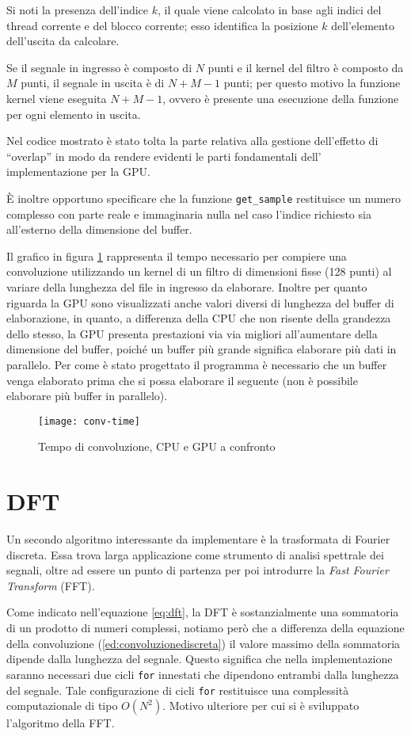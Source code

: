 Si noti la presenza dell'indice $k$, il quale viene calcolato in base agli indici del thread corrente e del blocco corrente; esso identifica la posizione $k$ dell'elemento dell'uscita da calcolare. 

Se il segnale in ingresso è composto di $N$ punti e il kernel del filtro è composto da $M$ punti, il segnale in uscita è di $N+M-1$ punti; per questo motivo la funzione kernel viene eseguita $N+M-1$, ovvero è presente una esecuzione della funzione per ogni elemento in uscita.

Nel codice mostrato è stato tolta la parte relativa alla gestione dell'effetto di ``overlap'' in modo da rendere evidenti le parti fondamentali dell' implementazione per la GPU.

È inoltre opportuno specificare che la funzione \lstinline{get_sample} restituisce un numero complesso con parte reale e immaginaria nulla nel caso l'indice richiesto sia all'esterno della dimensione del buffer.

Il grafico in figura \ref{fig:convtime} rappresenta il tempo necessario per compiere una convoluzione utilizzando un kernel di un filtro di dimensioni fisse (128 punti) al variare della lunghezza del file in ingresso da elaborare. Inoltre per quanto riguarda la GPU sono visualizzati anche valori diversi di lunghezza del buffer di elaborazione, in quanto, a differenza della CPU che non risente della grandezza dello stesso, la GPU presenta prestazioni via via migliori all'aumentare della dimensione del buffer, poiché un buffer più grande significa elaborare più dati in parallelo. Per come è stato progettato il programma è necessario che un buffer venga elaborato prima che si possa elaborare il seguente (non è possibile elaborare più buffer in parallelo).
\begin{figure}[h]
    \centering
    \texttt{[image: conv-time]}
    \caption{Tempo di convoluzione, CPU e GPU a confronto}
    \label{fig:convtime}
\end{figure}

\section{DFT}
Un secondo algoritmo interessante da implementare è la trasformata di Fourier discreta. Essa trova larga applicazione come strumento di analisi spettrale dei segnali, oltre ad essere un punto di partenza per poi introdurre la \textit{Fast Fourier Transform} (FFT).

Come indicato nell'equazione \ref{eq:dft}, la DFT è sostanzialmente una sommatoria di un prodotto di numeri complessi, notiamo però che a differenza della equazione della convoluzione (\ref{ed:convoluzionediscreta}) il valore massimo della sommatoria dipende dalla lunghezza del segnale. Questo significa che nella implementazione saranno necessari due cicli \lstinline{for} innestati che dipendono entrambi dalla lunghezza del segnale. Tale configurazione di cicli \lstinline{for} restituisce una complessità computazionale di tipo $O(N^2)$. Motivo ulteriore per cui si è sviluppato l'algoritmo della FFT.

